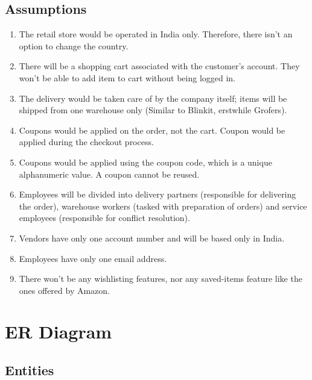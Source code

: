 \documentclass[12pt]{report}
\begin{document}
    \section{Assumptions}
    \begin{enumerate}
        \item The retail store would be operated in India only. Therefore, there isn't an option to change the country.
        \item There will be a shopping cart associated with the customer's account. They won't be able to add item to cart without being logged in.
        \item The delivery would be taken care of by the company itself; items will be shipped from one warehouse only (Similar to Blinkit, erstwhile Grofers).
        \item Coupons would be applied on the order, not the cart. Coupon would be applied during the checkout process.
        \item Coupons would be applied using the coupon code, which is a unique alphanumeric value. A coupon cannot be reused.
        \item Employees will be divided into delivery partners (responsible for delivering the order), warehouse workers (tasked with preparation of orders) and service employees (responsible for conflict resolution).
        \item Vendors have only one account number and will be based only in India.
        \item Employees have only one email address.
        \item There won't be any wishlisting features, nor any saved-items feature like the ones offered by Amazon.
    \end{enumerate}



    \chapter{ER Diagram}
    \section{Entities}
\end{document}
